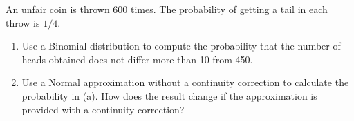
\begin{exercise}

An unfair coin is thrown 600 times. The probability of getting a tail in each throw
is $1/4$.

\begin{enumerate}[label = (\alph*)]
  \item Use a Binomial distribution to compute the probability that the number of heads
  obtained does not differ more than 10 from 450.
  \item Use a Normal approximation without a continuity correction to calculate
  the probability in (a). How does the result change if the approximation is provided
  with a continuity correction?
\end{enumerate}

\end{exercise}


